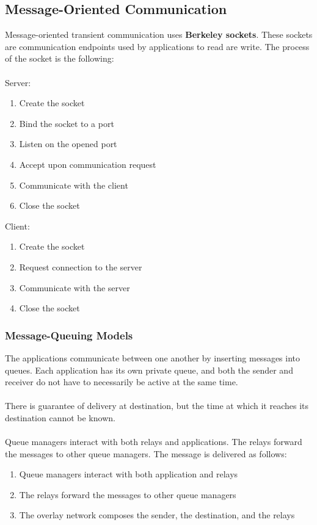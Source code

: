\documentclass{article}
\begin{document}
\subsection{Message-Oriented Communication}
Message-oriented transient communication uses \textbf{Berkeley sockets}. These sockets are communication endpoints used by applications to read are write. The process of the socket is the following: \\ \\
Server:

\begin{enumerate}
	\item Create the socket
	\item Bind the socket to a port
	\item Listen on the opened port
	\item Accept upon communication request
	\item Communicate with the client
	\item Close the socket
\end{enumerate}

\noindent Client:

\begin{enumerate}
	\item Create the socket
	\item Request connection to the server
	\item Communicate with the server
	\item Close the socket
\end{enumerate}

\subsubsection{Message-Queuing Models}
The applications communicate between one another by inserting messages into queues. Each application has its own private queue, and both the sender and receiver do not have to necessarily be active at the same time. \\ \\
There is guarantee of delivery at destination, but the time at which it reaches its destination cannot be known. \\ \\
Queue managers interact with both relays and applications. The relays forward the messages to other queue managers. The message is delivered as follows:

\begin{enumerate}
	\item Queue managers interact with both application and relays
	\item The relays forward the messages to other queue managers
	\item The overlay network composes the sender, the destination, and the relays
\end{enumerate}
\end{document}
